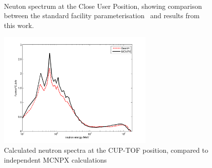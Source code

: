 \documentclass[11pt,a4paper]{IEEEtran}
\let\MYoriglatexcaption\caption
\renewcommand{\caption}[2][\relax]{\MYoriglatexcaption[#2]{#2}}
\begin{document}
\begin{figure}[t]
	\\
	\caption{Neuton spectrum at the Close User Position, showing comparison between the standard facility parameterisation~\cite{Prokofiev2009} and results from this work.}
	\label{fig:CUPSpectraComparison}
\end{figure}

\begin{figure}[t]
    \vspace{2in}
    \includegraphics[width=3in]{TOFcomparedLetFluxRADECS}
    \caption{Calculated neutron spectra at the CUP-TOF position, compared to independent MCNPX calculations~\cite{Prokofiev14}}
    \label{fig:MCComparison}
\end{figure}
\end{document}
